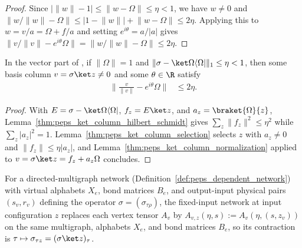 \begin{proof}\leanok
    Since $|\lVert w\rVert-1|\le\lVert w-\Omega\rVert\le\eta<1$, we have $w\ne0$ and $\lVert w/\lVert w\rVert-\Omega\rVert\le|1-\lVert w\rVert|+\lVert w-\Omega\rVert\le2\eta$. Applying this to $w=v/a=\Omega+f/a$ and setting $e^{i\theta}=a/|a|$ gives $\lVert v/\lVert v\rVert-e^{i\theta}\Omega\rVert=\lVert w/\lVert w\rVert-\Omega\rVert\le2\eta$.
\end{proof}

\begin{lemma}
    \label{thm:peps_ket_column_vector}
    \leanok
    In the vector part of \cite[Lemma~8.1]{OpenAI2026PolynomialPEPS}, if
    $\lVert\Omega\rVert=1$ and
    $\lVert\sigma-\ket\Omega\langle\Omega|\rVert_1\le\eta<1$, then some basis
    column $v=\sigma\ket z\ne0$ and some $\theta\in\R$ satisfy
    \begin{align}
        \Big\lVert\frac{v}{\lVert v\rVert}-e^{i\theta}\Omega\Big\rVert & \le2\eta .
    \end{align}
\end{lemma}

\begin{proof}\leanok
    With $E=\sigma-\ket\Omega\langle\Omega|$, $f_z=E\ket z$, and $a_z=\braket{\Omega}{z}$, Lemma~\ref{thm:peps_ket_column_hilbert_schmidt} gives $\sum_z\lVert f_z\rVert^2\le\eta^2$ while $\sum_z|a_z|^2=1$. Lemma~\ref{thm:peps_ket_column_selection} selects $z$ with $a_z\ne0$ and $\lVert f_z\rVert\le\eta|a_z|$, and Lemma~\ref{thm:peps_ket_column_normalization} applied to $v=\sigma\ket z=f_z+a_z\Omega$ concludes.
\end{proof}

\begin{definition}
    \label{def:peps_ket_column_dependent_fix_input}
    \leanok
    For a directed-multigraph network (Definition~\ref{def:peps_dependent_network}) with virtual alphabets $X_e$, bond matrices $B_e$, and output-input physical pairs $(s_v,r_v)$ defining the operator $\sigma=(\sigma_{\tau\rho})$, the fixed-input network at input configuration $z$ replaces each vertex tensor $A_v$ by $A_{v,z}(\eta,s):=A_v(\eta,(s,z_v))$ on the same multigraph, alphabets $X_e$, and bond matrices $B_e$, so its contraction is $\tau\mapsto\sigma_{\tau z}=(\sigma\ket z)_\tau$.
\end{definition}

